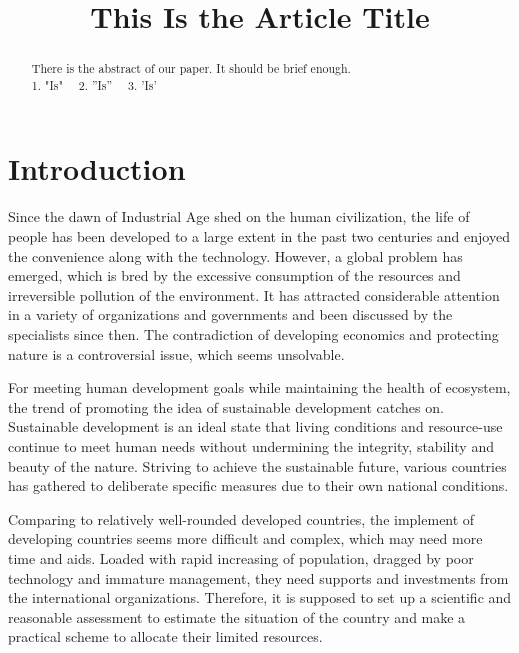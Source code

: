\documentclass[a4paper,11pt]{article}
\title{This Is the Article Title}%
\date{}
\begin{document}
\begin{abstract}
    There is the abstract of our paper. It should be brief enough.\\
    1. "Is" ~~2. ''Is'' ~~3. 'Is'

\end{abstract}
\maketitle%
\thispagestyle{empty}%

\newpage%
\thispagestyle{empty}%
\tableofcontents%
\thispagestyle{empty}
\newpage%

\section{Introduction}
Since the dawn of Industrial Age shed on the human civilization, the life of people has been developed to a large extent in the past two centuries and enjoyed the convenience along with the technology. However, a global problem has emerged, which is bred by the excessive consumption of the resources and irreversible pollution of the environment. It has attracted considerable attention in a variety of organizations and governments and been discussed by the specialists since then. The contradiction of developing economics and protecting nature is a controversial issue, which seems unsolvable.

For meeting human development goals while maintaining the health of ecosystem, the trend of promoting the idea of sustainable development catches on. Sustainable development is an ideal state that living conditions and resource-use continue to meet human needs without undermining the integrity, stability and beauty of the nature. Striving to achieve the sustainable future, various countries has gathered to deliberate specific measures due to their own national conditions.

Comparing to relatively well-rounded developed countries, the implement of developing countries seems more difficult and complex, which may need more time and aids. Loaded with rapid increasing of population, dragged by poor technology and immature management, they need supports and investments from the international organizations. Therefore, it is supposed to set up a scientific and reasonable assessment to estimate the situation of the country and make a practical scheme to allocate their limited resources.
\end{document}
